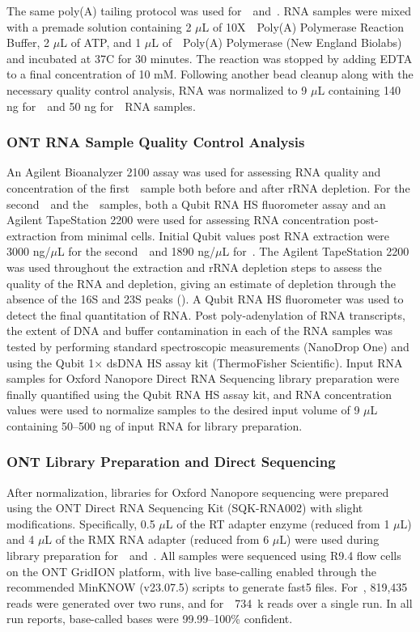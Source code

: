 The same poly(A) tailing protocol was used for~\syn~and~\syna.
RNA samples were mixed with a premade solution containing 2 $\mu$L of 10X~\eco~Poly(A) Polymerase Reaction Buffer, 2 $\mu$L of ATP, and 1 $\mu$L of~\eco~Poly(A) Polymerase (New England Biolabs) and incubated at 37\textdegree C for 30 minutes.
The reaction was stopped by adding EDTA to a final concentration of 10 mM.
Following another bead cleanup along with the necessary quality control analysis, RNA was normalized to 9 $\mu$L containing 140 ng for~\syn~and 50 ng for~\syna~RNA samples.

\subsubsection{ONT RNA Sample Quality Control Analysis}

An Agilent Bioanalyzer 2100 assay was used for assessing RNA quality and concentration of the first~\syn~sample both before and after rRNA depletion.
For the second~\syn~and the~\syna~samples, both a Qubit RNA HS fluorometer assay and an Agilent TapeStation 2200 were used for assessing RNA concentration post-extraction from minimal cells.
Initial Qubit values post RNA extraction were 3000 ng/$\mu$L for the second~\syn~and 1890 ng/$\mu$L for~\syna.
The Agilent TapeStation 2200 was used throughout the extraction and rRNA depletion steps to assess the quality of the RNA and depletion, giving an estimate of depletion through the absence of the 16S and 23S peaks (\sdqc).
A Qubit RNA HS fluorometer was used to detect the final quantitation of RNA.
Post poly-adenylation of RNA transcripts, the extent of DNA and buffer contamination in each of the RNA samples was tested by performing standard spectroscopic measurements (NanoDrop One) and using the Qubit 1$\times$ dsDNA HS assay kit (ThermoFisher Scientific).
Input RNA samples for Oxford Nanopore Direct RNA Sequencing library preparation were finally quantified using the Qubit RNA HS assay kit, and RNA concentration values were used to normalize samples to the desired input volume of 9 $\mu$L containing 50--500 ng of input RNA for library preparation.

\subsubsection{ONT Library Preparation and Direct Sequencing}

After normalization, libraries for Oxford Nanopore sequencing were prepared using the ONT Direct RNA Sequencing Kit (SQK-RNA002) with slight modifications.
Specifically, 0.5 $\mu$L of the RT adapter enzyme (reduced from 1 $\mu$L) and 4 $\mu$L of the RMX RNA adapter (reduced from 6 $\mu$L) were used during library preparation for~\syn~and~\syna.
All samples were sequenced using R9.4 flow cells on the ONT GridION platform, with live base-calling enabled through the recommended MinKNOW (v23.07.5) scripts to generate fast5 files.
For~\syn, 819{,}435 reads were generated over two runs, and for~\syna~734~k reads over a single run.
In all run reports, base-called bases were 99.99--100\% confident.

